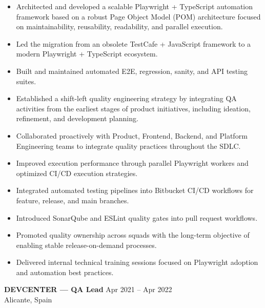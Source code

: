 \documentclass[11pt,a4paper]{article}
\begin{document}
\begin{itemize}[leftmargin=*, itemsep=0.3em]

    \item Architected and developed a scalable Playwright + TypeScript automation framework based on a robust Page Object Model (POM) architecture focused on maintainability, reusability, readability, and parallel execution.

    \item Led the migration from an obsolete TestCafe + JavaScript framework to a modern Playwright + TypeScript ecosystem.

    \item Built and maintained automated E2E, regression, sanity, and API testing suites.

    \item Established a shift-left quality engineering strategy by integrating QA activities from the earliest stages of product initiatives, including ideation, refinement, and development planning.

    \item Collaborated proactively with Product, Frontend, Backend, and Platform Engineering teams to integrate quality practices throughout the SDLC.

    \item Improved execution performance through parallel Playwright workers and optimized CI/CD execution strategies.

    \item Integrated automated testing pipelines into Bitbucket CI/CD workflows for feature, release, and main branches.

    \item Introduced SonarQube and ESLint quality gates into pull request workflows.

    \item Promoted quality ownership across squads with the long-term objective of enabling stable release-on-demand processes.

    \item Delivered internal technical training sessions focused on Playwright adoption and automation best practices.

\end{itemize}

\vspace{0.3cm}

\textbf{DEVCENTER — QA Lead} \hfill Apr 2021 -- Apr 2022 \\
Alicante, Spain
\end{document}
